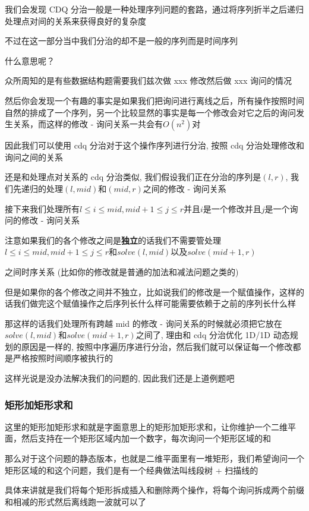 我们会发现 CDQ 分治一般是一种处理序列问题的套路，通过将序列折半之后递归处理点对间的关系来获得良好的复杂度

不过在这一部分当中我们分治的却不是一般的序列而是时间序列

什么意思呢？

众所周知的是有些数据结构题需要我们兹次做 xxx 修改然后做 xxx 询问的情况

然后你会发现一个有趣的事实是如果我们把询问进行离线之后，所有操作按照时间自然的排成了一个序列，另一个比较显然的事实是每一个修改会对它之后的询问发生关系，而这样的修改 - 询问关系一共会有$O(n^2)$对

因此我们可以使用 cdq 分治对于这个操作序列进行分治, 按照 cdq 分治处理修改和询问之间的关系

还是和处理点对关系的 cdq 分治类似, 我们假设我们正在分治的序列是$(l,r)$, 我们先递归的处理$(l,mid)$和$(mid,r)$之间的修改 - 询问关系

接下来我们处理所有$l \leq i \leq mid,mid+1 \leq j \leq r$并且$i$是一个修改并且$j$是一个询问的修改 - 询问关系

注意如果我们的各个修改之间是\textbf{独立}的话我们不需要管处理$l \leq i \leq mid,mid+1 \leq j \leq r$和$solve(l,mid)$以及$solve(mid+1,r)$

之间时序关系 (比如你的修改就是普通的加法和减法问题之类的)

但是如果你的各个修改之间并不独立，比如说我们的修改是一个赋值操作，这样的话我们做完这个赋值操作之后序列长什么样可能需要依赖于之前的序列长什么样

那这样的话我们处理所有跨越 mid 的修改 - 询问关系的时候就必须把它放在$solve(l,mid)$和$solve(mid+1,r)$之间了, 理由和 cdq 分治优化 1D/1D 动态规划的原因是一样的, 按照中序遍历序进行分治，然后我们就可以保证每一个修改都是严格按照时间顺序被执行的

这样光说是没办法解决我们的问题的, 因此我们还是上道例题吧

\subsubsection{矩形加矩形求和}

这里的矩形加矩形求和就是字面意思上的矩形加矩形求和，让你维护一个二维平面，然后支持在一个矩形区域内加一个数字，每次询问一个矩形区域的和

那么对于这个问题的静态版本，也就是二维平面里有一堆矩形，我们希望询问一个矩形区域的和这个问题，我们是有一个经典做法叫线段树 + 扫描线的

具体来讲就是我们将每个矩形拆成插入和删除两个操作，将每个询问拆成两个前缀和相减的形式然后离线跑一波就可以了

